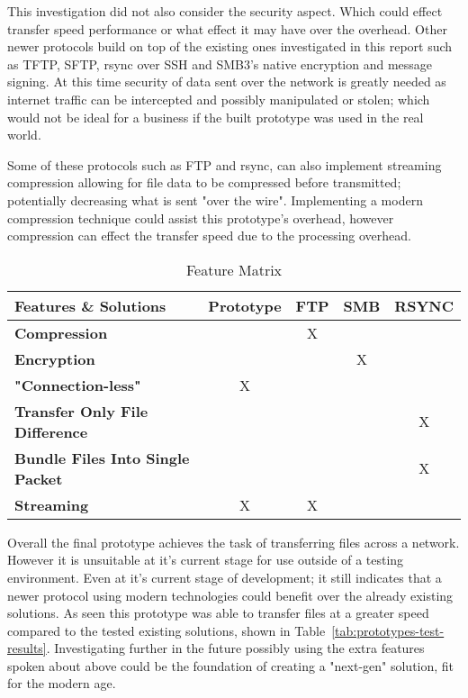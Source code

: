 This investigation did not also consider the security aspect. Which could effect transfer speed performance or what effect it may have over the overhead. Other newer protocols build on top of the existing ones investigated in this report such as TFTP, SFTP, rsync over SSH and SMB3's native encryption and message signing. At this time security of data sent over the network is greatly needed as internet traffic can be intercepted and possibly manipulated or stolen; which would not be ideal for a business if the built prototype was used in the real world.

Some of these protocols such as FTP and rsync, can also implement streaming compression allowing for file data to be compressed before transmitted; potentially decreasing what is sent "over the wire". Implementing a modern compression technique could assist this prototype's overhead, however compression can effect the transfer speed due to the processing overhead.

\begin{table}[h!]
	\caption{Feature Matrix}
	\label{tab:feature-matrix}
	\centering
	\begin{tabular}{| l || c | c | c | c |}
		\hline
		Features \& Solutions                    & \textbf{Prototype} & \textbf{FTP} & \textbf{SMB} & \textbf{RSYNC} \\
		\hline
		\hline
		\textbf{Compression}                     &                    & X            &              &                \\
		\hline
		\textbf{Encryption}                      &                    &              & X            &                \\
		\hline
		\textbf{"Connection-less"}               & X                  &              &              &                \\
		\hline
		\textbf{Transfer Only File Difference}   &                    &              &              & X              \\
		\hline
		\textbf{Bundle Files Into Single Packet} &                    &              &              & X              \\
		\hline
		\textbf{Streaming}                       & X                  & X            &              &                \\
		\hline
	\end{tabular}
\end{table}

Overall the final prototype achieves the task of transferring files across a network. However it is unsuitable at it's current stage for use outside of a testing environment. Even at it's current stage of development; it still indicates that a newer protocol using modern technologies could benefit over the already existing solutions. As seen this prototype was able to transfer files at a greater speed compared to the tested existing solutions, shown in Table~\ref{tab:prototypes-test-results}. Investigating further in the future possibly using the extra features spoken about above could be the foundation of creating a "next-gen" solution, fit for the modern age.
